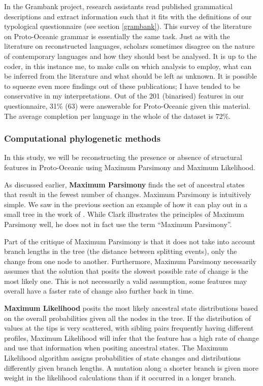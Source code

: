 \documentclass[draft,10pt]{article} %
\begin{document}
In the Grambank project, research assistants read published grammatical descriptions and extract information such that it fits with the definitions of our typological questionnaire (see section \ref{grambank}). This survey of the literature on Proto-Oceanic grammar is essentially the same task. Just as with the literature on reconstructed languages, scholars sometimes disagree on the nature of contemporary languages and how they should best be analysed. It is up to the coder, in this instance me, to make calls on which analysis to employ, what can be inferred from the literature and what should be left as unknown. It is possible to squeeze even more findings out of these publications; I have tended to be conservative in my interpretations. Out of the 201 (binarised) features in our questionnaire, 31\% (63) were answerable for Proto-Oceanic given this material. The average completion per language in the whole of the dataset is 72\%. 



\subsubsection{Computational phylogenetic methods}
\label{sec:asr_methods}

In this study, we will be reconstructing the presence or absence of structural features in Proto-Oceanic using Maximum Parsimony and Maximum Likelihood. 

As discussed earlier, \textbf{Maximum Parsimony} finds the set of ancestral states that result in the fewest number of changes. Maximum Parsimony is intuitively simple. We saw in the previous section an example of how it can play out in a small tree in the work of \cite{clark1976aspects}. While Clark illustrates the principles of Maximum Parsimony well, he does not in fact use the term ``Maximum Parsimony''. %

Part of the critique of Maximum Parsimony is that it does not take into account branch lengths in the tree (the distance between splitting events), only the change from one node to another. Furthermore, Maximum Parsimony necessarily assumes that the solution that posits the slowest possible rate of change is the most likely one. This is not necessarily a valid assumption, some features may overall have a faster rate of change also further back in time.

\textbf{Maximum Likelihood} posits the most likely ancestral state distributions based on the overall probabilities given all the nodes in the tree. If the distribution of values at the tips is very scattered, with sibling pairs frequently having different profiles, Maximum Likelihood will infer that the feature has a high rate of change and use that information when positing ancestral states. The Maximum Likelihood algorithm assigns probabilities of state changes and distributions differently given branch lengths. A mutation along a shorter branch is given more weight in the likelihood calculations than if it occurred in a longer branch.
\end{document}
